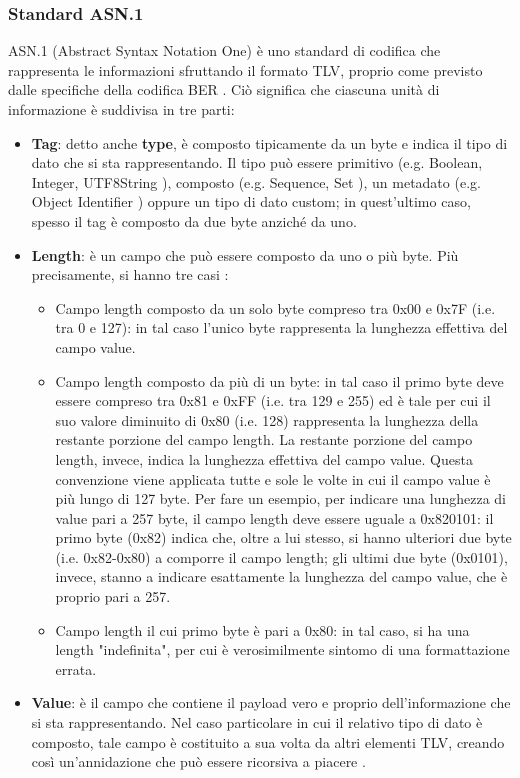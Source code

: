 \documentclass[10pt, oneside]{book}
\begin{document}
\subsubsection{Standard ASN.1}
ASN.1 (Abstract Syntax Notation One) è uno standard di codifica che rappresenta le informazioni sfruttando il formato TLV, proprio come previsto dalle specifiche della codifica BER \cite{RFC-6025}\cite{ASN1}. Ciò significa che ciascuna unità di informazione è suddivisa in tre parti:
\begin{itemize}
\item \textbf{Tag}: detto anche \textbf{type}, è composto tipicamente da un byte e indica il tipo di dato che si sta rappresentando. Il tipo può essere primitivo (e.g. Boolean, Integer, UTF8String \cite{ASN1-types}), composto (e.g. Sequence, Set \cite{ASN1-types}), un metadato (e.g. Object Identifier \cite{ASN1-types}) oppure un tipo di dato custom; in quest'ultimo caso, spesso il tag è composto da due byte anziché da uno.
\item \textbf{Length}: è un campo che può essere composto da uno o più byte. Più precisamente, si hanno tre casi \cite{ASN1}:
\begin{itemize}[itemsep=0pt]
\item Campo length composto da un solo byte compreso tra 0x00 e 0x7F (i.e. tra 0 e 127): in tal caso l'unico byte rappresenta la lunghezza effettiva del campo value.
\item Campo length composto da più di un byte: in tal caso il primo byte deve essere compreso tra 0x81 e 0xFF (i.e. tra 129 e 255) ed è tale per cui il suo valore diminuito di 0x80 (i.e. 128) rappresenta la lunghezza della restante porzione del campo length. La restante porzione del campo length, invece, indica la lunghezza effettiva del campo value. Questa convenzione viene applicata tutte e sole le volte in cui il campo value è più lungo di 127 byte. Per fare un esempio, per indicare una lunghezza di value pari a 257 byte, il campo length deve essere uguale a 0x820101: il primo byte (0x82) indica che, oltre a lui stesso, si hanno ulteriori due byte (i.e. 0x82-0x80) a comporre il campo length; gli ultimi due byte (0x0101), invece, stanno a indicare esattamente la lunghezza del campo value, che è proprio pari a 257.
\item Campo length il cui primo byte è pari a 0x80: in tal caso, si ha una length "indefinita", per cui è verosimilmente sintomo di una formattazione errata.
\end{itemize}
\item \textbf{Value}: è il campo che contiene il payload vero e proprio dell'informazione che si sta rappresentando. Nel caso particolare in cui il relativo tipo di dato è composto, tale campo è costituito a sua volta da altri elementi TLV, creando così un'annidazione che può essere ricorsiva a piacere \cite{ASN1}.
\end{itemize}
\end{document}
